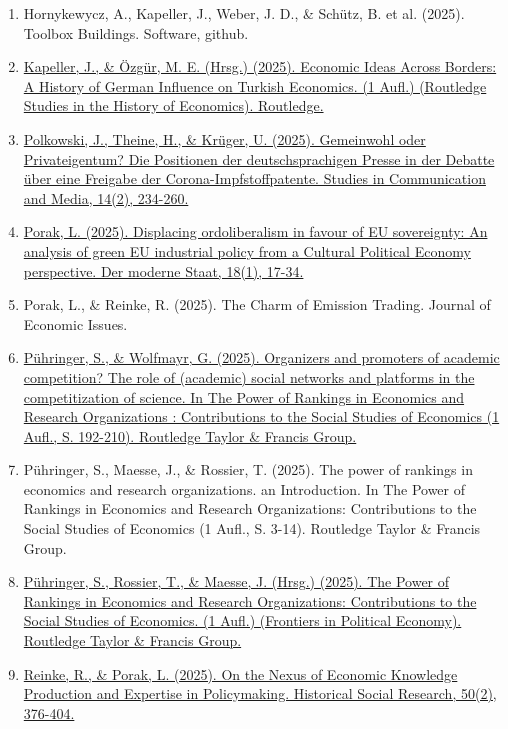 \begin{enumerate}
	 \item Hornykewycz, A., Kapeller, J., Weber, J. D., \& Schütz, B. et al. (2025). Toolbox Buildings. Software, github.
	 \item \href{https://doi.org/10.4324/9781003622000}{Kapeller, J., \& Özgür, M. E. (Hrsg.) (2025). Economic Ideas Across Borders: A History of German Influence on Turkish Economics. (1 Aufl.) (Routledge Studies in the History of Economics). Routledge.}
	 \item \href{https://doi.org/10.5771/2192-4007-2025-2-234}{Polkowski, J., Theine, H., \& Krüger, U. (2025). Gemeinwohl oder Privateigentum? Die Positionen der deutschsprachigen Presse in der Debatte über eine Freigabe der Corona-Impfstoffpatente. Studies in Communication and Media, 14(2), 234-260.}
	 \item \href{https://doi.org/10.3224/dms.v18i1.02}{Porak, L. (2025). Displacing ordoliberalism in favour of EU sovereignty: An analysis of green EU industrial policy from a Cultural Political Economy perspective. Der moderne Staat, 18(1), 17-34.}
	 \item Porak, L., \& Reinke, R. (2025). The Charm of Emission Trading. Journal of Economic Issues.
	 \item \href{https://doi.org/10.4324/9781032637310-14}{Pühringer, S., \& Wolfmayr, G. (2025). Organizers and promoters of academic competition? The role of (academic) social networks and platforms in the competitization of science. In The Power of Rankings in Economics and Research Organizations : Contributions to the Social Studies of Economics  (1 Aufl., S. 192-210). Routledge Taylor \& Francis Group.}
	 \item Pühringer, S., Maesse, J., \& Rossier, T. (2025). The power of rankings in economics and research organizations. an Introduction. In The Power of Rankings in Economics and Research Organizations: Contributions to the Social Studies of Economics (1 Aufl., S. 3-14). Routledge Taylor \& Francis Group.
	 \item \href{https://doi.org/10.4324/9781032637310}{Pühringer, S., Rossier, T., \& Maesse, J. (Hrsg.) (2025). The Power of Rankings in Economics and Research Organizations: Contributions to the Social Studies of Economics. (1 Aufl.) (Frontiers in Political Economy). Routledge Taylor \& Francis Group.}
	 \item \href{https://doi.org/10.12759/hsr.50.2025.28}{Reinke, R., \& Porak, L. (2025). On the Nexus of Economic Knowledge Production and Expertise in Policymaking. Historical Social Research, 50(2), 376-404.}

\end{enumerate}
